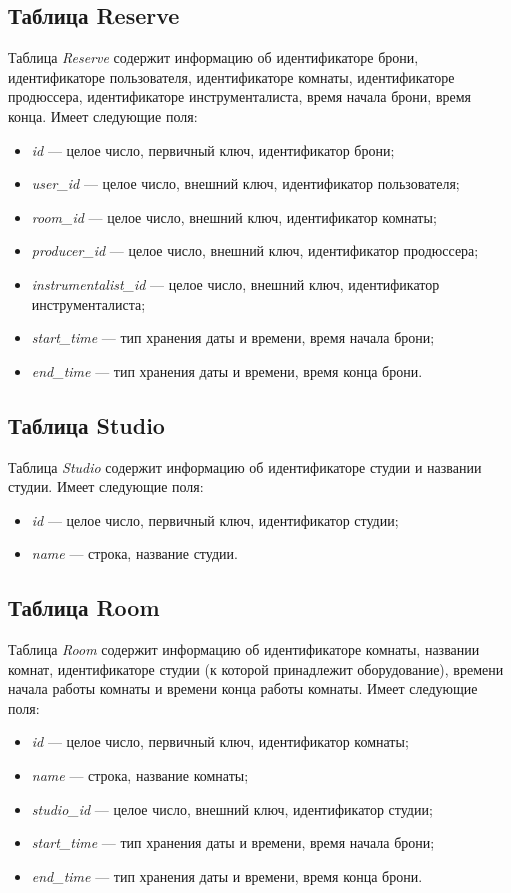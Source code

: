 \subsection{Таблица Reserve}
Таблица \textit{Reserve} содержит информацию об идентификаторе брони, идентификаторе пользователя, идентификаторе комнаты, идентификаторе продюссера, идентификаторе инструменталиста, время начала брони, время конца.
Имеет следующие поля:
\begin{itemize}
	\item \textit{id} --- целое число, первичный ключ, идентификатор брони;
	\item \textit{user\_id} --- целое число, внешний ключ, идентификатор пользователя;
	\item \textit{room\_id} --- целое число, внешний ключ, идентификатор комнаты;
	\item \textit{producer\_id} --- целое число, внешний ключ, идентификатор продюссера;
	\item \textit{instrumentalist\_id} --- целое число, внешний ключ, идентификатор инструменталиста;
	\item \textit{start\_time} --- тип хранения даты и времени, время начала брони;
	\item \textit{end\_time} --- тип хранения даты и времени, время конца брони.
\end{itemize}
\subsection{Таблица Studio}
Таблица \textit{Studio} содержит информацию об идентификаторе студии и названии студии.
Имеет следующие поля:
\begin{itemize}
	\item \textit{id} --- целое число, первичный ключ, идентификатор студии;
	\item \textit{name} --- строка, название студии.
\end{itemize}
\subsection{Таблица Room}
Таблица \textit{Room} содержит информацию об идентификаторе комнаты, названии комнат, идентификаторе студии (к которой принадлежит оборудование), времени начала работы комнаты и времени конца работы комнаты.
Имеет следующие поля:
\begin{itemize}
	\item \textit{id} --- целое число, первичный ключ, идентификатор комнаты;
	\item \textit{name} --- строка, название комнаты;
	\item \textit{studio\_id} --- целое число, внешний ключ, идентификатор студии;
	\item \textit{start\_time} --- тип хранения даты и времени, время начала брони;
	\item \textit{end\_time} --- тип хранения даты и времени, время конца брони.
\end{itemize}
